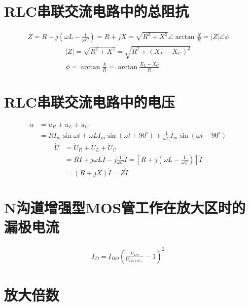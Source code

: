 \documentclass{ctexart}
\begin{document}
\newpage

\section{RLC串联交流电路中的总阻抗}
\begin{gather*}
Z = R + j(\omega L - \frac{1}{\omega C}) = R + jX = \sqrt{R^2 + X^2}\angle\arctan\frac{X}{R} = \left\vert Z \right\vert \angle\phi
\end{gather*}
\begin{gather*}
\left\vert Z \right\vert = \sqrt{R^2 + X^2} = \sqrt{R^2 + (X_L - X_C)^2} \\
\phi = \arctan\frac{X}{R} = \arctan\frac{X_L - X_C}{R}
\end{gather*}

\section{RLC串联交流电路中的电压}
\begin{align*}
u &= u_R + u_L + u_C \\
  &= RI_m\sin\omega t + \omega LI_m\sin(\omega t + 90^\circ) + \frac{1}{\omega C}I_m\sin(\omega t - 90^\circ)
\end{align*}
\begin{align*}
\dot{U} &= \dot{U}_R + \dot{U}_L + \dot{U}_C \\
        &= R\dot{I} + j\omega L\dot{I} - j\frac{1}{\omega C}\dot{I} = [R + j(\omega L - \frac{1}{\omega C})]\dot{I} \\
        &= (R + jX)\dot{I} = Z\dot{I}
\end{align*}

\section{N沟道增强型MOS管工作在放大区时的漏极电流}
\begin{gather*}
I_{D} = I_{DO}(\frac{U_{GS}}{U_{GS(th)}} - 1)^2
\end{gather*}

\section{放大倍数}
\end{document}
